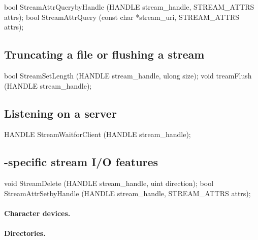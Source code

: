 \begin{paldef}
bool StreamAttrQuerybyHandle (HANDLE stream_handle,
                              STREAM_ATTRS attrs);
bool StreamAttrQuery (const char *stream_uri,
                      STREAM_ATTRS attrs);

\end{paldef}



\subsection*{Truncating a file or flushing a stream}


\begin{paldef}
bool StreamSetLength (HANDLE stream_handle, ulong size);
void treamFlush (HANDLE stream_handle);
\end{paldef}


\subsection*{Listening on a server}


\begin{paldef}
HANDLE StreamWaitforClient (HANDLE stream_handle);
\end{paldef} 


\subsection*{\graphene{}-specific stream I/O features}

\begin{paldef}
void StreamDelete (HANDLE stream_handle, uint direction);
bool StreamAttrSetbyHandle (HANDLE stream_handle,
                            STREAM_ATTRS attrs);
\end{paldef}



\paragraph{Character devices.}



\paragraph{Directories.}
